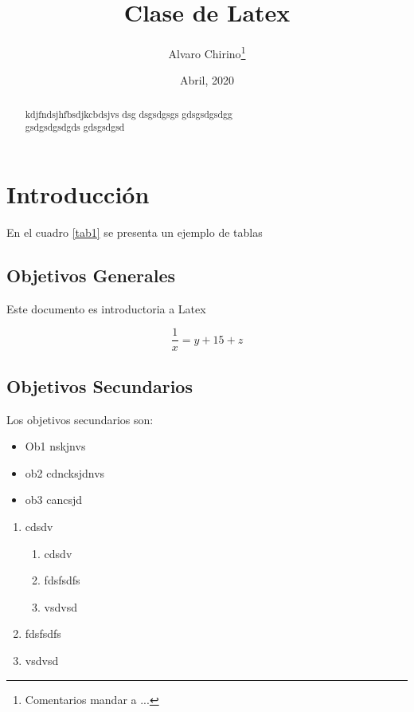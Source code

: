 \documentclass{article}
\title{Clase de Latex}
\author{Alvaro Chirino\footnote{Comentarios mandar a ...}  }
\date{Abril, 2020}
\begin{document}
\maketitle

\begin{abstract}
kdjfndsjhfbsdjkcbdsjvs dsg
dsgsdgsgs
gdsgsdgsdgg\\

gsdgsdgsdgds
gdsgsdgsd
\end{abstract}

\newpage

\tableofcontents
\listoftables
\listoffigures

\newpage

\section{Introducción}

En el cuadro \ref{tab1} se presenta un ejemplo de tablas

\subsection{Objetivos Generales}

Este documento es introductoria a Latex

\begin{equation}
\frac{1}{x}=y+15+z
\label{eq2}
\end{equation}

\subsection{Objetivos Secundarios}
Los objetivos secundarios son:

\begin{itemize}
\item Ob1 nskjnvs
\item ob2 cdncksjdnvs
\item ob3 cancsjd
\end{itemize}

\begin{enumerate}
\item cdsdv
	\begin{enumerate}
	\item cdsdv
	\item fdsfsdfs
	\item vsdvsd
	\end{enumerate}
\item fdsfsdfs
\item vsdvsd
\end{enumerate}
\end{document}
